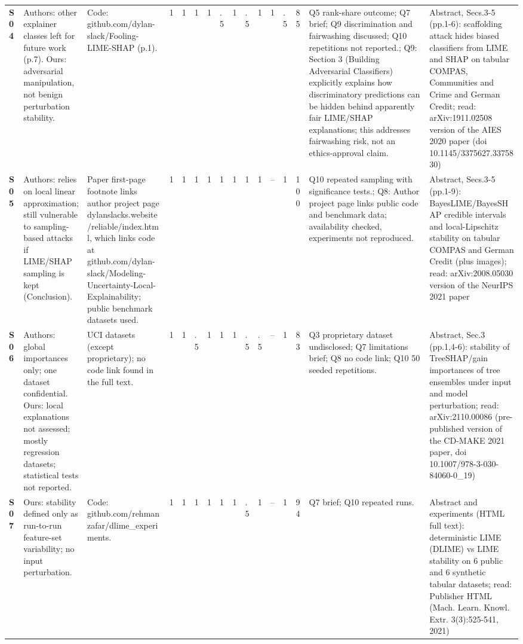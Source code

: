\begin{longtable}{@{}P{1.0cm}P{4.6cm}P{3.6cm}P{0.3cm}P{0.3cm}P{0.3cm}P{0.3cm}P{0.3cm}P{0.3cm}P{0.3cm}P{0.3cm}P{0.3cm}P{0.36cm}P{0.75cm}P{3.0cm}P{3.9cm}@{}}
\textbf{S04} & Authors: other explainer classes left for future work (p.7). Ours: adversarial manipulation, not benign perturbation stability. & Code: github.com/\allowbreak{}dylan-slack/\allowbreak{}Fooling-LIME-SHAP (p.1). & 1 & 1 & 1 & 1 & .5 & 1 & .5 & 1 & 1 & .5 & 85 & Q5 rank-share outcome; Q7 brief; Q9 discrimination and fairwashing discussed; Q10 repetitions not reported.; Q9: Section 3 (Building Adversarial Classifiers) explicitly explains how discriminatory predictions can be hidden behind apparently fair LIME/\allowbreak{}SHAP explanations; this addresses fairwashing risk, not an ethics-approval claim. & Abstract, Secs.3-5 (pp.1-6): scaffolding attack hides biased classifiers from LIME and SHAP on tabular COMPAS, Communities and Crime and German Credit; read: arXiv:1911.02508 version of the AIES 2020 paper (doi 10.1145/\allowbreak{}3375627.3375830) \\
\textbf{S05} & Authors: relies on local linear approximation; still vulnerable to sampling-based attacks if LIME/\allowbreak{}SHAP sampling is kept (Conclusion). & Paper first-page footnote links author project page dylanslacks.website/\allowbreak{}reliable/\allowbreak{}index.html, which links code at github.com/\allowbreak{}dylan-slack/\allowbreak{}Modeling-Uncertainty-Local-Explainability; public benchmark datasets used. & 1 & 1 & 1 & 1 & 1 & 1 & 1 & 1 & -- & 1 & 100 & Q10 repeated sampling with significance tests.; Q8: Author project page links public code and benchmark data; availability checked, experiments not reproduced. & Abstract, Secs.3-5 (pp.1-9): BayesLIME/\allowbreak{}BayesSHAP credible intervals and local-Lipschitz stability on tabular COMPAS and German Credit (plus images); read: arXiv:2008.05030 version of the NeurIPS 2021 paper \\
\textbf{S06} & Authors: global importances only; one dataset confidential. Ours: local explanations not assessed; mostly regression datasets; statistical tests not reported. & UCI datasets (except proprietary); no code link found in the full text. & 1 & 1 & .5 & 1 & 1 & 1 & .5 & .5 & -- & 1 & 83 & Q3 proprietary dataset undisclosed; Q7 limitations brief; Q8 no code link; Q10 50 seeded repetitions. & Abstract, Sec.3 (pp.1,4-6): stability of TreeSHAP/\allowbreak{}gain importances of tree ensembles under input and model perturbation; read: arXiv:2110.00086 (pre-published version of the CD-MAKE 2021 paper, doi 10.1007/\allowbreak{}978-3-030-84060-0\_\allowbreak{}19) \\
\textbf{S07} & Ours: stability defined only as run-to-run feature-set variability; no input perturbation. & Code: github.com/\allowbreak{}rehmanzafar/\allowbreak{}dlime\_\allowbreak{}experiments. & 1 & 1 & 1 & 1 & 1 & 1 & .5 & 1 & -- & 1 & 94 & Q7 brief; Q10 repeated runs. & Abstract and experiments (HTML full text): deterministic LIME (DLIME) vs LIME stability on 6 public and 6 synthetic tabular datasets; read: Publisher HTML (Mach. Learn. Knowl. Extr. 3(3):525-541, 2021) \\

\end{longtable}
